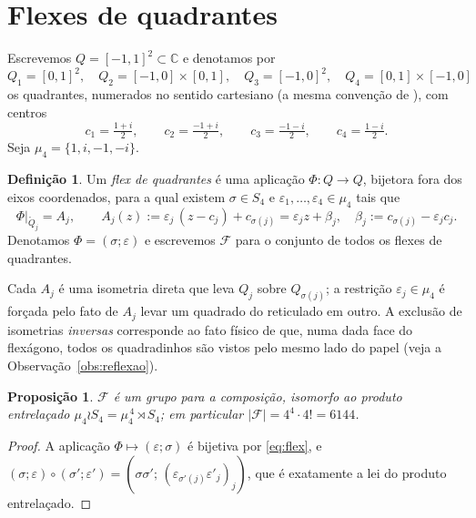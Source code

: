 \documentclass[11pt,a4paper]{article}
\theoremstyle{plain}
\newtheorem{proposicao}[teorema]{Proposição}
\theoremstyle{definition}
\newtheorem{definicao}[teorema]{Definição}
\theoremstyle{remark}
\newcommand{\C}{\mathbb{C}}
\newcommand{\FF}{\mathscr{F}}
\begin{document}
\section{Flexes de quadrantes}\label{sec:flex}

Escrevemos $Q=[-1,1]^2\subset\C$ e denotamos por
\[
Q_1=[0,1]^2,\quad Q_2=[-1,0]\times[0,1],\quad
Q_3=[-1,0]^2,\quad Q_4=[0,1]\times[-1,0]
\]
os quadrantes, numerados no sentido cartesiano (a mesma convenção de
\cite[\S3.4]{manual}), com centros
\[
c_1=\tfrac{1+i}{2},\qquad c_2=\tfrac{-1+i}{2},\qquad
c_3=\tfrac{-1-i}{2},\qquad c_4=\tfrac{1-i}{2}.
\]
Seja $\mu_4=\{1,i,-1,-i\}$.

\begin{definicao}\label{def:flex}
Um \emph{flex de quadrantes} é uma aplicação $\Phi:Q\to Q$, bijetora fora dos
eixos coordenados, para a qual existem $\sigma\in S_4$ e
$\varepsilon_1,\dots,\varepsilon_4\in\mu_4$ tais que
\begin{equation}\label{eq:flex}
\Phi|_{\mathring Q_j}=A_j,\qquad
A_j(z):=\varepsilon_j\,(z-c_j)+c_{\sigma(j)}
      =\varepsilon_j z+\beta_j,\quad
\beta_j:=c_{\sigma(j)}-\varepsilon_j c_j .
\end{equation}
Denotamos $\Phi=(\sigma;\varepsilon)$ e escrevemos $\FF$ para o conjunto de
todos os flexes de quadrantes.
\end{definicao}

Cada $A_j$ é uma isometria direta que leva $Q_j$ sobre $Q_{\sigma(j)}$; a
restrição $\varepsilon_j\in\mu_4$ é forçada pelo fato de $A_j$ levar um quadrado
do reticulado em outro. A exclusão de isometrias \emph{inversas} corresponde ao
fato físico de que, numa dada face do flexágono, todos os quadradinhos são
vistos pelo mesmo lado do papel (veja a Observação~\ref{obs:reflexao}).

\begin{proposicao}
$\FF$ é um grupo para a composição, isomorfo ao produto entrelaçado
$\mu_4\wr S_4=\mu_4^{\,4}\rtimes S_4$; em particular
$|\FF|=4^4\cdot 4!=6144$.
\end{proposicao}

\begin{proof}
A aplicação $\Phi\mapsto(\varepsilon;\sigma)$ é bijetiva por
\eqref{eq:flex}, e $(\sigma;\varepsilon)\circ(\sigma';\varepsilon')
=(\sigma\sigma';\,(\varepsilon_{\sigma'(j)}\varepsilon'_j)_j)$, que é
exatamente a lei do produto entrelaçado.
\end{proof}
\end{document}
